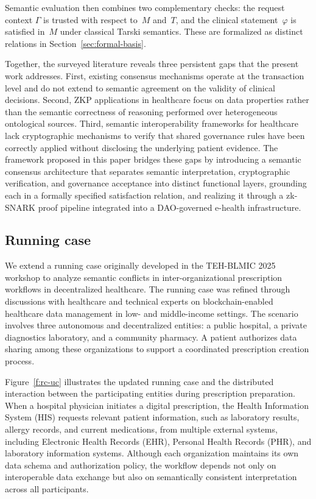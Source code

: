 \documentclass[journal]{IEEEtran}
\begin{document}
Semantic evaluation then combines two complementary checks: the
request context $\Gamma$ is trusted with respect to~$M$ and~$T$,
and the clinical statement~$\varphi$ is satisfied in~$M$ under
classical Tarski semantics. These are formalized as distinct
relations in Section~\ref{sec:formal-basis}.

Together, the surveyed literature reveals three persistent gaps
that the present work addresses. First, existing consensus
mechanisms operate at the transaction level and do not extend to
semantic agreement on the validity of clinical decisions. Second,
ZKP applications in healthcare focus on data properties rather
than the semantic correctness of reasoning performed over
heterogeneous ontological sources. Third, semantic
interoperability frameworks for healthcare lack cryptographic
mechanisms to verify that shared governance rules have been
correctly applied without disclosing the underlying patient
evidence. The framework proposed in this paper bridges these
gaps by introducing a semantic consensus architecture that
separates semantic interpretation, cryptographic verification,
and governance acceptance into distinct functional layers,
grounding each in a formally specified satisfaction relation,
and realizing it through a zk-SNARK proof pipeline integrated
into a DAO-governed e-health infrastructure.

\subsection{Running case}
\label{ss:rc}
We extend a running case originally developed in the TEH-BLMIC 2025 workshop to analyze semantic conflicts in inter-organizational prescription workflows in decentralized healthcare. The running case was refined through discussions with healthcare and technical experts on blockchain-enabled healthcare data management in low- and middle-income settings. The scenario involves three autonomous and decentralized entities: a public hospital, a private diagnostics laboratory, and a community pharmacy. A patient authorizes data sharing among these organizations to support a coordinated prescription creation process.

Figure~\ref{f:rc-uc} illustrates the updated running case and the distributed interaction between the participating entities during prescription preparation. When a hospital physician initiates a digital prescription, the Health Information System (HIS) requests relevant patient information, such as laboratory results, allergy records, and current medications, from multiple external systems, including Electronic Health Records (EHR), Personal Health Records (PHR), and laboratory information systems. Although each organization maintains its own data schema and authorization policy, the workflow depends not only on interoperable data exchange but also on semantically consistent interpretation across all participants.
\end{document}
